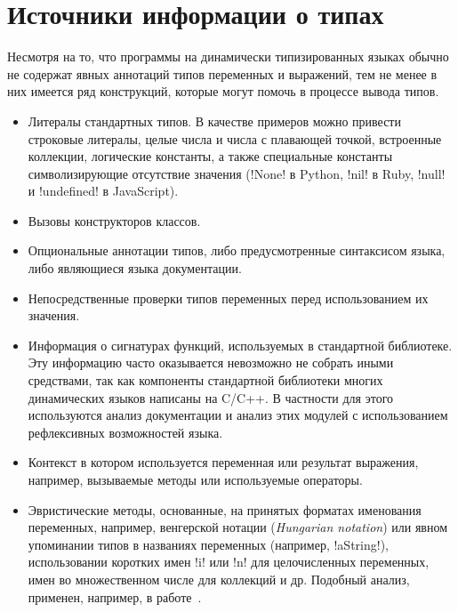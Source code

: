 
\section{Источники информации о типах}
\label{sec:type-sources}


Несмотря на то, что программы на динамически типизированных языках обычно не
содержат явных аннотаций типов переменных и выражений, тем не менее в них
имеется ряд конструкций, которые могут помочь в процессе вывода типов. 

\begin{itemize}
    \item{Литералы стандартных типов. В качестве примеров можно привести
        строковые литералы, целые числа и числа с плавающей точкой, встроенные
        коллекции, логические константы, а также специальные константы символизирующие
        отсутствие значения (!None! в Python, !nil! в Ruby,
        !null! и !undefined! в JavaScript).}
    \item{Вызовы конструкторов классов.}
    \item{Опциональные аннотации типов, либо предусмотренные синтаксисом языка, либо
        являющиеся языка документации.}
    \item{Непосредственные проверки типов переменных перед использованием их
        значения.}
    \item{Информация о сигнатурах функций, используемых в стандартной
        библиотеке. Эту информацию часто оказывается невозможно не собрать иными
        средствами, так как компоненты стандартной библиотеки многих
        динамических языков написаны на C/C++. В частности для этого
        используются анализ документации и анализ этих модулей с использованием
        рефлексивных возможностей языка.}
    \item{Контекст в котором используется переменная или результат выражения, 
        например, вызываемые методы или используемые операторы.}
    \item{Эвристические методы, основанные, на принятых форматах
        именования переменных, например, венгерской нотации (\emph{Hungarian
          notation}) или явном упоминании типов в названиях переменных (например,
        !aString!), использовании коротких имен !i! или !n!
        для целочисленных переменных, имен во множественном числе для коллекций
        и др. Подобный анализ, применен, например, в работе~\cite[]{Tu}.
    }
\end{itemize}
     

